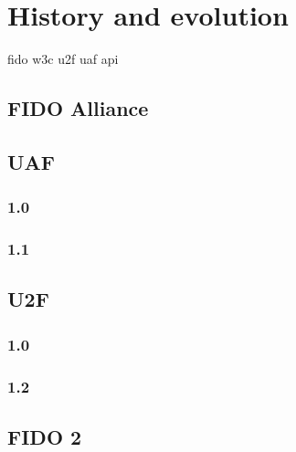 \section{History and evolution}

\gls{fido} \gls{w3c} \gls{u2f} \gls{uaf} \gls{api}

\subsection{FIDO Alliance}

\subsection{UAF}

\subsubsection{1.0}

\subsubsection{1.1}

\subsection{U2F}

\subsubsection{1.0}

\subsubsection{1.2}

\subsection{FIDO 2}